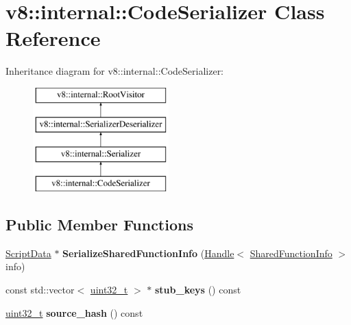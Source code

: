 \hypertarget{classv8_1_1internal_1_1CodeSerializer}{}\section{v8\+:\+:internal\+:\+:Code\+Serializer Class Reference}
\label{classv8_1_1internal_1_1CodeSerializer}
Inheritance diagram for v8\+:\+:internal\+:\+:Code\+Serializer\+:\begin{figure}[H]
\begin{center}
\leavevmode
\includegraphics[height=4.000000cm]{classv8_1_1internal_1_1CodeSerializer}
\end{center}
\end{figure}
\subsection*{Public Member Functions}
\begin{DoxyCompactItemize}
\item 
\mbox{\label{classv8_1_1internal_1_1CodeSerializer_ab64bf98caf25b2236ddc0b52763b5155}} 
\mbox{\hyperlink{classv8_1_1internal_1_1ScriptData}{Script\+Data}} $\ast$ {\bfseries Serialize\+Shared\+Function\+Info} (\mbox{\hyperlink{classv8_1_1internal_1_1Handle}{Handle}}$<$ \mbox{\hyperlink{classv8_1_1internal_1_1SharedFunctionInfo}{Shared\+Function\+Info}} $>$ info)
\item 
\mbox{\label{classv8_1_1internal_1_1CodeSerializer_a58e4a2ef4a0c97188187975dbe13da4c}} 
const std\+::vector$<$ \mbox{\hyperlink{classuint32__t}{uint32\+\_\+t}} $>$ $\ast$ {\bfseries stub\+\_\+keys} () const
\item 
\mbox{\label{classv8_1_1internal_1_1CodeSerializer_a712cf3e0f92e5e595833ef01d8b9709b}} 
\mbox{\hyperlink{classuint32__t}{uint32\+\_\+t}} {\bfseries source\+\_\+hash} () const
\end{DoxyCompactItemize}
